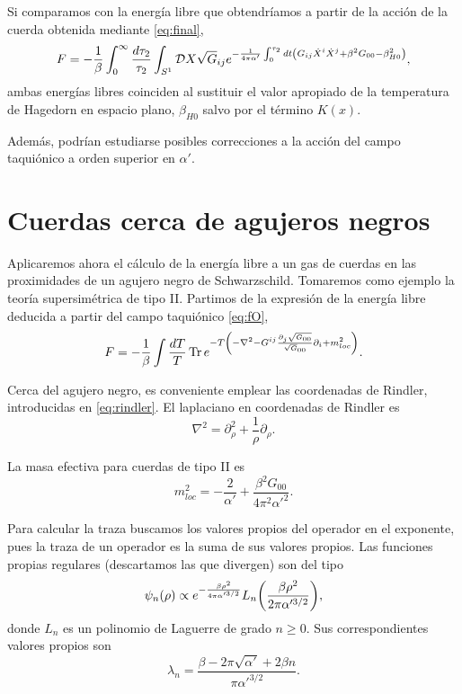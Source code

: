 Si comparamos con la energía libre que obtendríamos a partir de la acción de la cuerda obtenida
mediante \ref{eq:final},
\begin{equation}
  F=-\frac{1}{\beta} \int_0^\infty \frac{d\tau_2}{\tau_2} \int_{S^1} \mathcal D X\sqrt G_{ij}  e^{ -\frac{1}{4\pi\alpha'}\int_0^{\tau_2} dt \qty(  
  G_{ij}\dot X^i \dot X^j  + \beta^2 G_{00} - \beta^2_{H0})},
\end{equation}
ambas energías libres coinciden al sustituir el valor apropiado de la temperatura de Hagedorn
en espacio plano, $\beta_{H0}$ salvo por el término $K(x)$.

Además, podrían estudiarse posibles correcciones a la acción del campo taquiónico a orden superior en $\alpha'$.

\section{Cuerdas cerca de agujeros negros}

Aplicaremos ahora el cálculo de la energía libre a un gas de cuerdas en las proximidades
de un agujero negro de Schwarzschild. 
Tomaremos como ejemplo la teoría supersimétrica de tipo II. 
Partimos de la expresión de la energía libre deducida a partir del campo taquiónico \ref{eq:fO},
\begin{equation}
  F=-\frac{1}{\beta}\int \frac{dT}{T} \Tr e^{-T\qty(  -\nabla^2-G^{ij}\frac{\partial_j \sqrt{G_{00}}}{\sqrt G_{00}}\partial_i + m^2_{loc}) }.
\end{equation}


Cerca del agujero negro, es conveniente emplear las coordenadas de Rindler, introducidas en \ref{eq:rindler}.
El laplaciano en coordenadas de Rindler es
\begin{equation}
  \nabla^2  = \partial_\rho^2 + \frac{1}{\rho}\partial_\rho.
\end{equation}

La masa efectiva para cuerdas de tipo II es 
\begin{equation}
  m_{loc}^2=-\frac{2}{\alpha'}+\frac{\beta^2G_{00}}{4\pi^2\alpha'^2}.
\end{equation}

Para calcular la traza buscamos los valores propios del operador en el exponente,
pues la traza de un operador es la suma de sus valores propios.
Las funciones propias regulares (descartamos las que divergen) son del tipo
\begin{equation}
  \psi_n(\rho)\propto e^{-\frac{\beta \rho^2}{4\pi\alpha'^{3/2}} }
  L_n\qty(\frac{\beta\rho^2}{2\pi\alpha'^{3/2}}),
\end{equation}
donde $L_n$ es un polinomio de Laguerre de grado $n\geq0$.
Sus correspondientes valores propios son
\begin{equation}
  \lambda_n=\frac{\beta-2\pi\sqrt{\alpha'}+2\beta n }{\pi\alpha'^{3/2}}.
\end{equation}

